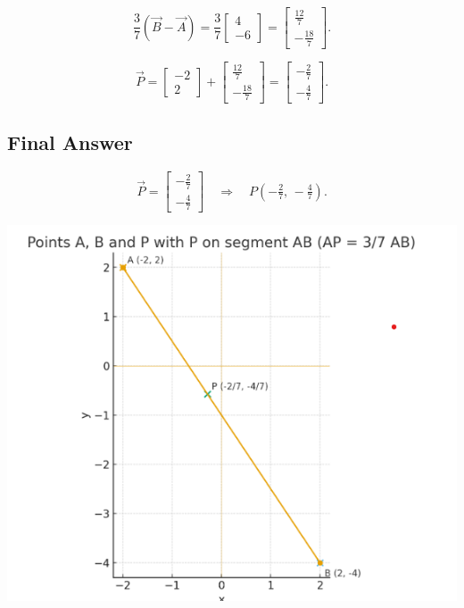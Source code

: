 \documentclass[journal]{IEEEtran}
\begin{document}
\[
\frac{3}{7}(\vec{B}-\vec{A}) =
\frac{3}{7}\begin{bmatrix}4 \\ -6\end{bmatrix}
=
\begin{bmatrix}\tfrac{12}{7} \\ -\tfrac{18}{7}\end{bmatrix}.
\]

\[
\vec{P} =
\begin{bmatrix}-2 \\ 2\end{bmatrix}
+ \begin{bmatrix}\tfrac{12}{7} \\ -\tfrac{18}{7}\end{bmatrix}
=
\begin{bmatrix}-\tfrac{2}{7} \\ -\tfrac{4}{7}\end{bmatrix}.
\]

\subsection*{Final Answer}
\[
\vec{P} =
\begin{bmatrix}-\tfrac{2}{7} \\ -\tfrac{4}{7}\end{bmatrix}
\quad\Rightarrow\quad
P\left(-\tfrac{2}{7},\,-\tfrac{4}{7}\right).
\]

\begin{center}
    \includegraphics[width=0.6\columnwidth]{figs/plot1.png}
\end{center}
\end{document}
